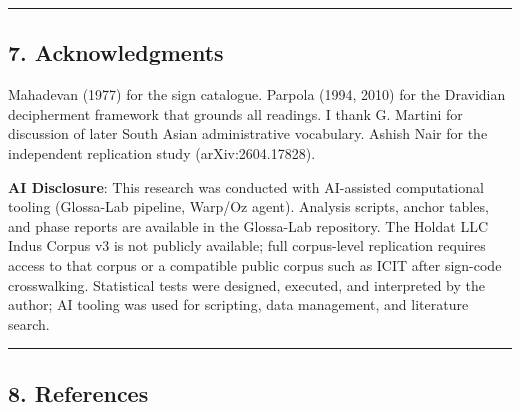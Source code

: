 \documentclass[
]{article}
\begin{document}
\begin{center}\rule{0.5\linewidth}{0.5pt}\end{center}

\subsection{7. Acknowledgments}\label{acknowledgments}

Mahadevan (1977) for the
sign catalogue. Parpola (1994, 2010) for the Dravidian decipherment
framework that grounds all readings. I thank G. Martini for discussion of later South Asian administrative vocabulary.
Ashish Nair for the independent replication study (arXiv:2604.17828).

\textbf{AI Disclosure}: This research was conducted with AI-assisted
computational tooling (Glossa-Lab pipeline, Warp/Oz agent). Analysis scripts, anchor tables, and phase reports are available in the Glossa-Lab repository. The Holdat LLC Indus Corpus v3 is not publicly available; full corpus-level replication requires access to that corpus or a compatible public corpus such as ICIT after sign-code crosswalking. Statistical tests were designed,
executed, and interpreted by the author; AI tooling was used for
scripting, data management, and literature search.

\begin{center}\rule{0.5\linewidth}{0.5pt}\end{center}

\subsection{8. References}\label{references}
\end{document}
